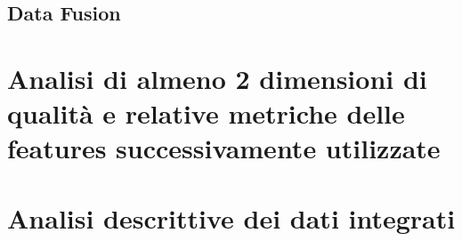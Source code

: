 \section{Data Fusion}
\label{sec:data-fusion}

\chapter{Analisi di almeno 2 dimensioni di qualità e relative metriche delle features successivamente utilizzate}

\chapter{Analisi descrittive dei dati integrati}
